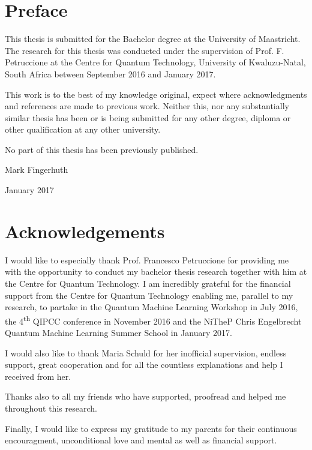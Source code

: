 
\chapter*{Preface}

This thesis is submitted for the Bachelor degree at the University of Maastricht. The research for this thesis was conducted under the supervision of Prof. F. Petruccione at the Centre for Quantum Technology, University of Kwaluzu-Natal, South Africa between September 2016 and January 2017.

This work is to the best of my knowledge original, expect where acknowledgments and references are made to previous work. Neither this, nor any substantially similar thesis has been or is being submitted for any other degree, diploma or other qualification at any other university.

No part of this thesis has been previously published.

\flushright
Mark Fingerhuth

January 2017
\justify
 \cleardoublepage
 
 
 \chapter*{Acknowledgements}

I would like to especially thank Prof. Francesco Petruccione for providing me with the opportunity to conduct my bachelor thesis research together with him at the Centre for Quantum Technology. I am incredibly grateful for the financial support from the Centre for Quantum Technology enabling me, parallel to my research, to partake in the Quantum Machine Learning Workshop in July 2016, the 4\textsuperscript{th} QIPCC conference in November 2016 and the NiTheP Chris Engelbrecht Quantum Machine Learning Summer School in January 2017. 

I would also like to thank Maria Schuld for her inofficial supervision, endless support, great cooperation and for all the countless explanations and help I received from her.

Thanks also to all my friends who have supported, proofread and helped me throughout this research.

Finally, I would like to express my gratitude to my parents for their continuous encouragment, unconditional love and mental as well as financial support.

